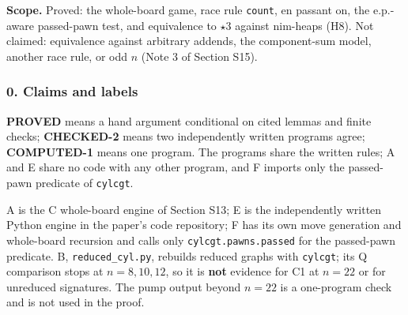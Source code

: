 \textbf{Scope.} Proved: the whole-board game, race rule \texttt{count}, en passant on, the e.p.-aware passed-pawn test, and equivalence to $\star3$ against nim-heaps (H8). Not claimed: equivalence against arbitrary addends, the component-sum model, another race rule, or odd $n$ (Note 3 of Section S15).

\subsubsection*{0. Claims and labels}
\textbf{PROVED} means a hand argument conditional on cited lemmas and finite checks; \textbf{CHECKED-2} means two independently written programs agree; \textbf{COMPUTED-1} means one program. The programs share the written rules; A and E share no code with any other program, and F imports only the passed-pawn predicate of \texttt{cylcgt}.

\par{}\par\smallskip
A is the C whole-board engine of Section S13; E is the independently written Python engine in the paper's code repository; F has its own move generation and whole-board recursion and calls only \texttt{cylcgt.pawns.passed} for the passed-pawn predicate. B, \texttt{reduced\_cyl.py}, rebuilds reduced graphs with \texttt{cylcgt}; its Q comparison stops at $n=8,10,12$, so it is \textbf{not} evidence for C1 at $n=22$ or for unreduced signatures. The pump output beyond $n=22$ is a one-program check and is not used in the proof.

